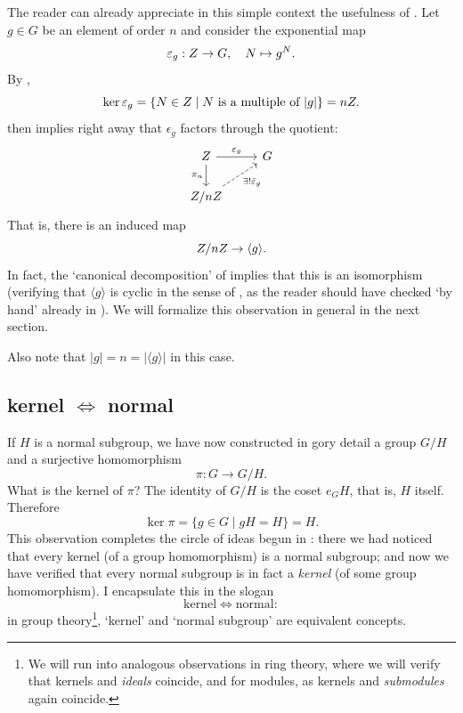The reader can already appreciate in this simple context the
usefulness of
. Let $g \in G$ be
an element of order $n$ and consider the exponential map
\[
  \varepsilon_g : Z \to G, \quad N \mapsto g^N.
\]
By ,
\[
  \ker\varepsilon_g = \{N \in Z \mid N \text{ is a multiple of } |g|\} =
  nZ.
\]
 then implies
right away that $\epsilon_g$ factors through the quotient:
\[
  \begin{tikzcd}
    \Z \arrow[r, "\epsilon_g"] \arrow[d, "\pi_n"'] & G \\
    \Z/n\Z \arrow[ur, dashed, "\exists ! \bar\epsilon_g"'] &
  \end{tikzcd}
\]
That is, there is an induced map
\[
  Z/nZ \to \langle g \rangle.
\]
In fact, the `canonical decomposition' of
 implies that this is
an isomorphism (verifying that $\langle g \rangle$ is cyclic in the
sense of , as the reader should have checked
`by hand' already in ). We
will formalize this observation in general in the next section.

Also note that $|g| = n = |\langle g \rangle|$ in this case.

\subsection{\texorpdfstring{kernel $\Leftrightarrow$ normal}{kernel
    iff normal}}
\label{subsec:groups:kernel-iff-normal}
If $H$ is a normal subgroup, we have now constructed in gory detail a
group $G/H$ and a surjective homomorphism
\[
  \pi : G \to G/H.
\]
What is the kernel of $\pi$? The identity of $G/H$ is the coset
$e_GH$, that is, $H$ itself. Therefore
\[
  \ker\pi = \{g \in G \mid gH = H\} = H.
\]
This observation completes the circle of ideas begun in
: there we had noticed that
every kernel (of a group homomorphism) is a normal subgroup; and now
we have verified that every normal subgroup is in fact a \emph{kernel}
(of some group homomorphism). I encapsulate this in the slogan
\[
  \text{kernel} \iff \text{normal}:
\]
in group theory\footnote{We will run into analogous observations in
  ring theory, where we will verify that kernels and \emph{ideals}
  coincide, and for modules, as kernels and \emph{submodules} again
  coincide.}, `kernel' and `normal subgroup' are equivalent concepts.

